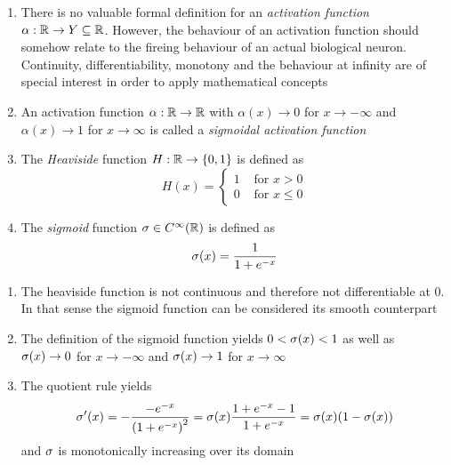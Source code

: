 \begin{definition}
    \hfill
    \begin{enumerate}
        \item There is no valuable formal definition for an \emph{activation function}
              \( \alpha: \mathbb{R} \to Y \subseteq \mathbb{R} \). However, the behaviour of an activation function should
              somehow relate to the fireing behaviour of an actual biological neuron. Continuity,
              differentiability, monotony and the behaviour at infinity are of special interest in order
              to apply mathematical concepts
        \item An activation function \( \alpha: \mathbb{R} \to \mathbb{R} \) with \( \alpha(x) \to 0 \)
              for \( x \to -\infty \) and \( \alpha(x) \to 1 \) for \( x \to \infty \) is called a
              \emph{sigmoidal activation function}
        \item The \emph{Heaviside} function \( H: \mathbb{R} \to \{ 0, 1 \} \) is defined as
              \[
                  H(x) = \left \{
                  \begin{array}{ll}
                      1 & \text{ for } x > 0  \\
                      0 & \text{ for }x \le 0
                  \end{array}
                  \right.
              \]
        \item The \emph{sigmoid} function \( \sigma \in C^\infty(\mathbb{R}) \) is defined as
              \[
                  \sigma(x) = \frac{1}{1 + e^{-x}}
              \]
    \end{enumerate}
\end{definition}
\bigskip


\begin{remarks}
    \hfill
    \begin{enumerate}
        \item The heaviside function is not continuous and therefore not differentiable at \( 0 \).
              In that sense the sigmoid function can be considered its smooth counterpart
        \item The definition of the sigmoid function yields \( 0 < \sigma(x) < 1 \) as well as
              \( \sigma(x) \to 0 \) for \( x \to -\infty \) and \( \sigma(x) \to 1 \)
              for \( x \to \infty \)
        \item The quotient rule yields
              \[
                  \sigma'(x)
                  = -\frac{-e^{-x}}{{(1 + e^{-x})}^2}
                  = \sigma(x) \frac{1 + e^{-x} - 1}{1 + e^{-x}}
                  = \sigma(x)(1 - \sigma(x))
              \]
              and \( \sigma \) is monotonically increasing over its domain
    \end{enumerate}
\end{remarks}
\bigskip


